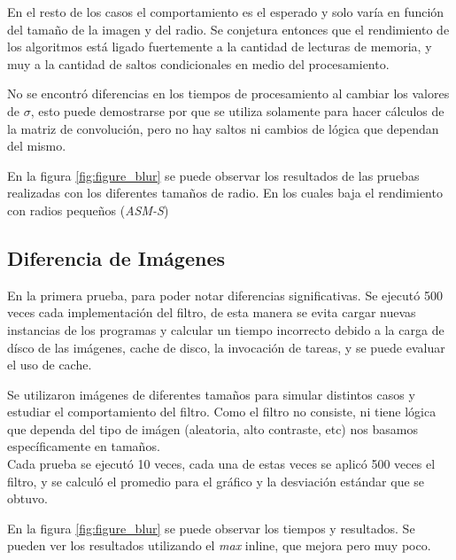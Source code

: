 En el resto de los casos el comportamiento es el esperado y solo var\'ia en funci\'on del tamaño de la imagen y del radio. Se conjetura entonces que el rendimiento de los algoritmos est\'a ligado fuertemente a la cantidad de lecturas de memoria, y muy a la cantidad de saltos condicionales en medio del procesamiento.

No se encontr\'o diferencias en los tiempos de procesamiento al cambiar los valores de $\sigma$, esto puede demostrarse por que se utiliza solamente para hacer c\'alculos de la matriz de convoluci\'on, pero no hay saltos ni cambios de l\'ogica que dependan del mismo.

En la figura \ref{fig:figure_blur} se puede observar los resultados de las pruebas realizadas con los diferentes tama\~nos de radio. En los cuales baja el rendimiento con radios peque\~nos (\emph{ASM-S})


\FloatBarrier
\subsection{Diferencia de Im\'agenes}

En la primera prueba, para poder notar diferencias significativas. Se ejecut\'o 500 veces cada implementaci\'on del filtro, de esta manera se evita cargar nuevas instancias de los programas y calcular un tiempo incorrecto debido a la carga de d\'isco de las im\'agenes, cache de disco, la invocaci\'on de tareas, y se puede evaluar el uso de cache.

Se utilizaron im\'agenes de diferentes tama\~nos para simular distintos casos y estudiar el comportamiento del filtro. Como el filtro no consiste, ni tiene l\'ogica que dependa del tipo de im\'agen (aleatoria, alto contraste, etc) nos basamos espec\'ificamente en tama\~nos. \\
Cada prueba se ejecut\'o 10 veces, cada una de estas veces se aplic\'o 500 veces el filtro, y se calcul\'o el promedio para el gr\'afico y la desviaci\'on est\'andar que se obtuvo.

En la figura \ref{fig:figure_blur} se puede observar los tiempos y resultados. Se pueden ver los resultados utilizando el \emph{max} inline, que mejora pero muy poco.

